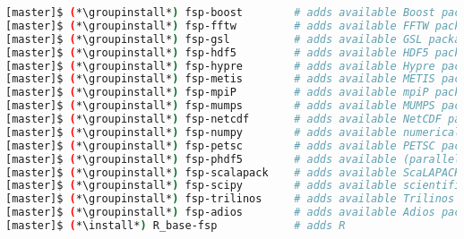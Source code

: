 \begin{lstlisting}[language=bash,keywords={},upquote=true,keepspaces]
[master]$ (*\groupinstall*) fsp-boost        # adds available Boost packages
[master]$ (*\groupinstall*) fsp-fftw         # adds available FFTW packages
[master]$ (*\groupinstall*) fsp-gsl          # adds available GSL packages
[master]$ (*\groupinstall*) fsp-hdf5         # adds available HDF5 packages
[master]$ (*\groupinstall*) fsp-hypre        # adds available Hypre packages
[master]$ (*\groupinstall*) fsp-metis        # adds available METIS packages
[master]$ (*\groupinstall*) fsp-mpiP         # adds available mpiP packages
[master]$ (*\groupinstall*) fsp-mumps        # adds available MUMPS packages
[master]$ (*\groupinstall*) fsp-netcdf       # adds available NetCDF packages
[master]$ (*\groupinstall*) fsp-numpy        # adds available numerical Python packages
[master]$ (*\groupinstall*) fsp-petsc        # adds available PETSC packages
[master]$ (*\groupinstall*) fsp-phdf5        # adds available (parallel) HDF5 packages
[master]$ (*\groupinstall*) fsp-scalapack    # adds available ScaLAPACK packages
[master]$ (*\groupinstall*) fsp-scipy        # adds available scientific Python packages
[master]$ (*\groupinstall*) fsp-trilinos     # adds available Trilinos packages
[master]$ (*\groupinstall*) fsp-adios        # adds available Adios packages
[master]$ (*\install*) R_base-fsp            # adds R
\end{lstlisting}
